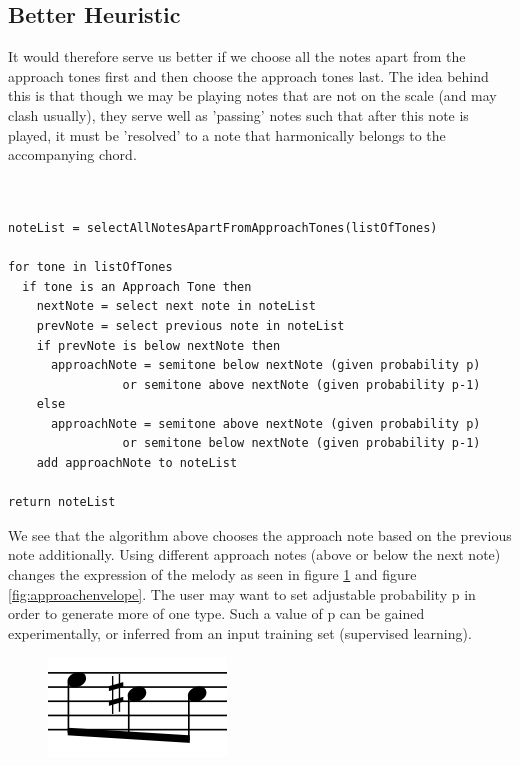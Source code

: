 \documentclass[pdftex,12pt,a4paper]{report}
\begin{document}
\subsection{Better Heuristic}
It would therefore serve us better if we choose all the notes apart from the approach tones first and then choose the approach tones last. The idea behind this is that though we may be playing notes that are not on the scale (and may clash usually), they serve well as 'passing' notes such that after this note is played, it must be 'resolved' to a note that harmonically belongs to the accompanying chord. 

\begin{verbatim}


noteList = selectAllNotesApartFromApproachTones(listOfTones)

for tone in listOfTones
  if tone is an Approach Tone then
    nextNote = select next note in noteList
    prevNote = select previous note in noteList
    if prevNote is below nextNote then
      approachNote = semitone below nextNote (given probability p)
                or semitone above nextNote (given probability p-1)
    else
      approachNote = semitone above nextNote (given probability p)
                or semitone below nextNote (given probability p-1)
    add approachNote to noteList

return noteList

\end{verbatim}

We see that the algorithm above chooses the approach note based on the previous note additionally. Using different approach notes (above or below the next note) changes the expression of the melody as seen in figure \ref{fig:approachnormal} and figure \ref{fig:approachenvelope}. The user may want to set adjustable probability p in order to generate more of one type. Such a value of p can be gained experimentally, or inferred from an input training set (supervised learning).

\begin{figure}[h]
  \centering
  \includegraphics[scale=0.4]{figure/approachnormal.png}
  \label{fig:approachnormal}
\end{figure}
\end{document}
